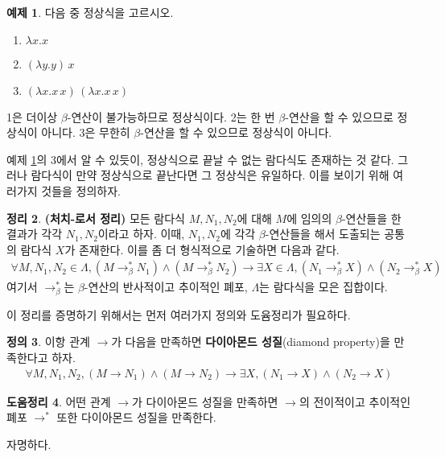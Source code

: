 \documentclass[b5paper, 11pt]{book}
\theoremstyle{definition}
\newtheorem{defn}{정의}[chapter]
\newtheorem{thm}[defn]{정리}
\newtheorem{ex}[defn]{예제}
\newtheorem{lem}[defn]{도움정리}
\newenvironment{pf*}{\pushQED{\qed}\pf}
{\popQED\endpf}
\begin{document}
\begin{ex}
    \label{normal form ex}
    다음 중 정상식을 고르시오.
    \begin{enumerate}
        \item $\lambda x. x$
        \item $(\lambda y. y) \, x$
        \item $(\lambda x.x \, x) \, (\lambda x. x \, x)$
    \end{enumerate}
    1은 더이상 $\beta$-연산이 불가능하므로 정상식이다. 2는 한 번 $\beta$-연산을 할 수 있으므로 정상식이 아니다. 3은 무한히 $\beta$-연산을 할 수 있으므로 정상식이 아니다.
\end{ex}
예제 \ref{normal form ex}의 3에서 알 수 있듯이, 정상식으로 끝날 수 없는 람다식도 존재하는 것 같다. 그러나 람다식이 만약 정상식으로 끝난다면 그 정상식은 유일하다. 이를 보이기 위해 여러가지 것들을 정의하자.
\begin{thm} \label{church-rosser}
    \textbf{(처치-로서 정리)} 모든 람다식 $M, N_1, N_2$에 대해 $M$에  임의의 $\beta$-연산들을 한 결과가 각각 $N_1, N_2$이라고 하자. 이때, $N_1, N_2$에 각각 $\beta$-연산들을 해서 도출되는 공통의 람다식 $X$가 존재한다. 이를 좀 더 형식적으로 기술하면 다음과 같다.
    \begin{align*}
        \forall M, N_1, N_2 \in \Lambda, (M \rightarrow_\beta^* N_1) \wedge (M \rightarrow_\beta^* N_2) \rightarrow \exists X \in \Lambda, (N_1 \rightarrow_\beta^* X) \wedge (N_2 \rightarrow_\beta^* X)
    \end{align*}
    여기서 $\rightarrow_\beta^*$는 $\beta$-연산의 반사적이고 추이적인 폐포, $\Lambda$는 람다식을 모은 집합이다.
\end{thm}
이 정리를 증명하기 위해서는 먼저 여러가지 정의와 도윰정리가 필요하다.
\begin{defn}
    이항 관계 $\rightarrow$가 다음을 만족하면 \textbf{다이아몬드 성질}(diamond property)을 만족한다고 하자.
    \begin{align*}
        \forall M, N_1, N_2, (M \rightarrow N_1) \wedge (M \rightarrow N_2) \rightarrow \exists X, (N_1 \rightarrow X) \wedge (N_2 \rightarrow X)
    \end{align*}
\end{defn}
\begin{lem} \label{diamond property lemma}
    어떤 관계 $\rightarrow$가 다이아몬드 성질을 만족하면 $\rightarrow$의 전이적이고 추이적인 폐포 $\rightarrow^*$ 또한 다이아몬드 성질을 만족한다.
\end{lem}
\begin{pf*}
    자명하다.
\end{pf*}
\end{document}
